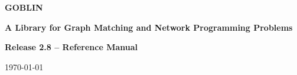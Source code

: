 \documentclass[a4paper,11pt,twoside]{book}
\begin{document}
\pagestyle{empty}
\setcounter{page}{-1}
\makeatletter
\newenvironment{tablehere}
  {\def\@captype{table}}
  {}

\newenvironment{figurehere}
  {\def\@captype{figure}}
  {}
\makeatother

\thispagestyle{empty}
\begin{center}
\vspace*{0.01cm}
{\bf\Huge GOBLIN}

\vspace*{1cm}
{\bf\huge A Library for Graph Matching and
Network Programming Problems}

\vspace{1.0cm}
\epsfxsize=12cm

\vspace{1.0cm}
{\bf\huge Release 2.8 -- Reference Manual}

\medskip
\today
\end{center}



\cleardoublepage
\begin{multicols}{2}


\tableofcontents



\cleardoublepage
\pagestyle{fancy}

\end{multicols}
\end{document}

